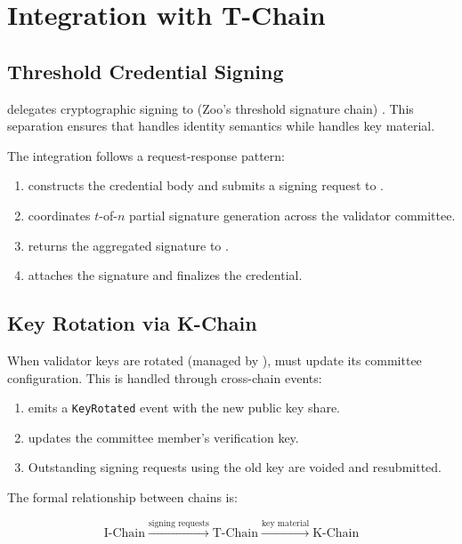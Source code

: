 \section{Integration with T-Chain}


\subsection{Threshold Credential Signing}

\IChain{} delegates cryptographic signing to \TChain{} (Zoo's threshold signature chain) \cite{zoo-threshold-signatures}. This separation ensures that \IdentityVM{} handles identity semantics while \TChain{} handles key material.

The integration follows a request-response pattern:

\begin{enumerate}
\item \IdentityVM{} constructs the credential body and submits a signing request to \TChain{}.
\item \TChain{} coordinates $t$-of-$n$ partial signature generation across the validator committee.
\item \TChain{} returns the aggregated signature to \IdentityVM{}.
\item \IdentityVM{} attaches the signature and finalizes the credential.
\end{enumerate}

\subsection{Key Rotation via K-Chain}

When validator keys are rotated (managed by \KChain{} \cite{zoo-key-management}), \IChain{} must update its committee configuration. This is handled through cross-chain events:

\begin{enumerate}
\item \KChain{} emits a \texttt{KeyRotated} event with the new public key share.
\item \IdentityVM{} updates the committee member's verification key.
\item Outstanding signing requests using the old key are voided and resubmitted.
\end{enumerate}

The formal relationship between chains is:

\begin{equation}
\text{I-Chain} \xrightarrow{\text{signing requests}} \text{T-Chain} \xrightarrow{\text{key material}} \text{K-Chain}
\end{equation}

